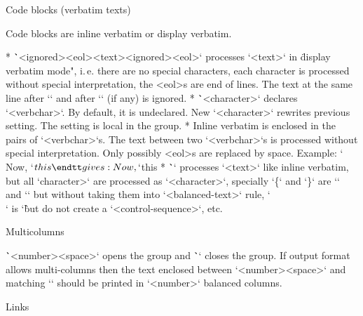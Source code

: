 \secc Code blocks (verbatim texts)

Code blocks are inline verbatim or display verbatim.

\begitems
* \.`\begtt <ignored><eol><text>\endtt<ignored><eol>` processes `<text>` in
  \"display verbatim mode", i.\,e. there are no special characters, each character
  is processed without special interpretation, the <eol>s are end of lines.
  The text at the same line after `\begtt` and after `\endtt` (if any) is
  ignored.
* \.`\verbchar <character>` declares `<verbchar>`. By default, it is undeclared.\nl
  New `\verbchar <character>` rewrites previous setting. The setting is
  local in the group.
* Inline verbatim is enclosed in the pairs of `<verbchar>`s.
  The text between two `<verbchar>`s is processed without special interpretation.
  Only possibly <eol>s are replaced by space.
  Example:
  \begtt
  \verbchar`
  Now, `$this %text   ~\` is processed as inline verbatim.
  \endtt
  gives: Now, `$this %
* \.`` processes `<text>` like inline verbatim, but
  all `\<character>` are processed as `<character>`, specially `\{` and `\}`
  are `{` and `}` but without taking them into `<balanced-text>` rule,
  `\\` is `\` but do not create a `<control-sequence>`, etc.
\enditems


\secc Multicolumns

\.`\begmulti <number><space>` opens the group and \.`\endmulti`
closes the group. If output format allows multi-columns then
the text enclosed between `\begmulti <number><space>` and matching
`\endmulti` should be printed in `<number>` balanced columns.


\secc Links

